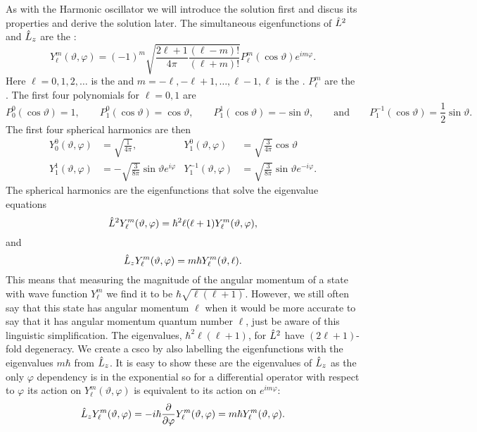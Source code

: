 \documentclass[a4paper]{article}
\theoremstyle{definition}
\begin{document}
    As with the Harmonic oscillator we will introduce the solution first and discus its properties and derive the solution later.
    The simultaneous eigenfunctions of \(\hat{L}^2\) and \(\hat{L}_z\) are the :
    \[Y^m_\ell(\vartheta, \varphi) = (-1)^m\sqrt{\frac{2\ell + 1}{4\pi}\frac{(\ell - m)!}{(\ell + m)!}} P^m_\ell(\cos\vartheta)e^{im\varphi}.\]
    Here \(\ell = 0, 1, 2, \dotsc\) is the  and \(m = -\ell, -\ell + 1, \dotsc, \ell - 1, \ell\) is the .
    \(P_\ell^m\) are the .
    The first four polynomials for \(\ell = 0, 1\) are
    \[P_0^0(\cos\vartheta) = 1, \qquad P_1^0(\cos\vartheta) = \cos\vartheta, \qquad P_1^1(\cos\vartheta) = -\sin\vartheta, \qquad\text{and}\qquad P_1^{-1}(\cos\vartheta) = \frac{1}{2}\sin\vartheta.\]
    The first four spherical harmonics are then
    \begin{align*}
        Y_0^0(\vartheta, \varphi) &= \sqrt{\frac{1}{4\pi}}, \qquad & Y_1^0(\vartheta, \varphi) &= \sqrt{\frac{3}{4\pi}}\cos\vartheta\\
        Y_1^1(\vartheta, \varphi) &= -\sqrt{\frac{3}{8\pi}}\sin\vartheta e^{i\varphi} & 
        Y_1^{-1}(\vartheta, \varphi) &= \sqrt{\frac{3}{8\pi}}\sin\vartheta e^{-i\varphi}.
    \end{align*}
    The spherical harmonics are the eigenfunctions that solve the eigenvalue equations
    \[\hat{L}^2Y_\ell^m(\vartheta, \varphi) = \hbar^2\ell(\ell + 1)Y_\ell^m(\vartheta, \varphi),\]
    and
    \[\hat{L}_zY_\ell^m(\vartheta, \varphi) = m\hbar Y_\ell^m(\vartheta, \ell).\]
    This means that measuring the magnitude of the angular momentum of a state with wave function \(Y_\ell^m\) we find it to be \(\hbar\sqrt{\ell(\ell + 1)}\).
    However, we still often say that this state has angular momentum \(\ell\) when it would be more accurate to say that it has angular momentum quantum number \(\ell\), just be aware of this linguistic simplification.
    The eigenvalues, \(\hbar^2\ell(\ell + 1)\), for \(\hat{L}^2\) have \((2\ell + 1)\)-fold degeneracy.
    We create a \gls{csco} by also labelling the eigenfunctions with the eigenvalues \(m\hbar\) from \(\hat{L}_z\).
    It is easy to show these are the eigenvalues of \(\hat{L}_z\) as the only \(\varphi\) dependency is in the exponential so for a differential operator with respect to \(\varphi\) its action on \(Y_\ell^m(\vartheta, \varphi)\) is equivalent to its action on  \(e^{im\varphi}\):
    \[\hat{L}_zY_\ell^m(\vartheta, \varphi) = -i\hbar\pdv{\varphi}Y_\ell^m(\vartheta, \varphi) = m\hbar Y_\ell^m(\vartheta, \varphi).\]
    
\end{document}
